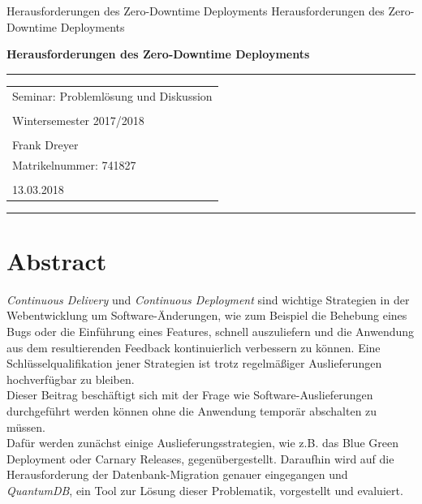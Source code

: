 \documentclass[deutsch]{lib/llncs/llncs}
\begin{document}
\markboth
{Herausforderungen des Zero-Downtime Deployments}
{Herausforderungen des Zero-Downtime Deployments}
\thispagestyle{empty}


\begin{flushleft}
\LARGE\bfseries Herausforderungen des Zero-Downtime Deployments


\end{flushleft}
\rule{\textwidth}{1pt}
\vspace{2pt}


\begin{flushright}
\Huge


\begin{tabular}{@{}l}
Seminar: Problemlösung und Diskussion\\\\
Wintersemester 2017/2018\\\\
Frank Dreyer\\
Matrikelnummer: 741827\\\\
13.03.2018\\[6pt]
\end{tabular}


\end{flushright}
\rule{\textwidth}{1pt}
\vfill

\newpage
\tableofcontents
\newpage\vspace{2pt}


\section{Abstract}
\textit{Continuous Delivery} und \textit{Continuous Deployment} sind wichtige Strategien in der Webentwicklung um Software-Änderungen,  wie zum Beispiel die Behebung eines Bugs oder die Einführung eines Features, schnell auszuliefern und die Anwendung aus dem resultierenden Feedback kontinuierlich verbessern zu können. Eine Schlüsselqualifikation jener Strategien ist trotz regelmäßiger Auslieferungen hochverfügbar zu bleiben. \\
Dieser Beitrag beschäftigt sich mit der Frage wie Software-Auslieferungen durchgeführt werden können ohne die Anwendung temporär abschalten zu müssen. \\
Dafür werden zunächst einige Auslieferungsstrategien, wie z.B. das Blue Green Deployment oder Carnary Releases, gegenübergestellt. Daraufhin wird auf die Herausforderung der Datenbank-Migration genauer eingegangen und \textit{QuantumDB}, ein Tool zur Lösung dieser Problematik, vorgestellt und evaluiert. 
\end{document}
